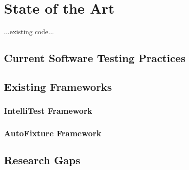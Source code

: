 
\chapter{State of the Art\label{chap:state_of_the_art}}

...existing code...

\section{Current Software Testing Practices}


\section{Existing Frameworks}

\subsection{IntelliTest Framework}


\subsection{AutoFixture Framework}


\section{Research Gaps}

